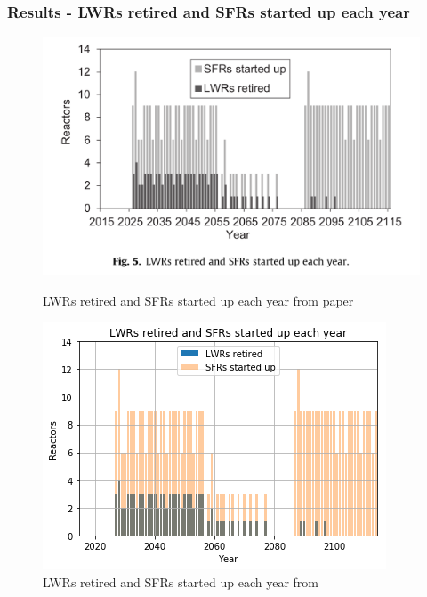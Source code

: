 \begin{frame}
    \frametitle{Results - LWRs retired and SFRs started up each year}
    \begin{figure}[htbp!]
        \begin{minipage}[b]{.45\linewidth}
            \begin{center}
                \includegraphics[width=\textwidth]{./images/literature/dep.png}
            \end{center}
            \caption{LWRs retired and SFRs started up each year from paper \footnotemark}
        \end{minipage}
        \hspace{.5cm}
        \begin{minipage}[b]{.45\linewidth}
            \centering
                \includegraphics[width=\linewidth]{./images/results/dep.png}
            \caption{LWRs retired and SFRs started up each year from \Cyclus}
        \end{minipage}
    \end{figure}
\end{frame}

